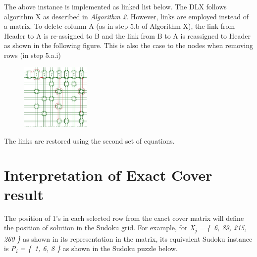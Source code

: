 \documentclass[a4paper,oneside,11pt]{report}
\begin{document}
The above instance is implemented as linked list below. The DLX follows algorithm X as described in \textit{Algorithm 2}.  However, links are employed instead of a matrix. To delete column A (as in step 5.b of Algorithm X), the link from Header to A is re-assigned to B and the link from B to A is reassigned to Header as shown in the following figure. This is also the case to the nodes when removing rows (in step 5.a.i)
\begin{figure}[h]
  \centering
  {\includegraphics[width=0.3\textwidth]{dlxlinkedlist.jpg}\label{fig:linkedlist}}
\end{figure}
\newline
The links are restored using the second set of equations.

\section{Interpretation of Exact Cover result}
The position of 1’s in each selected row from the exact cover matrix will define the position of solution in the Sudoku grid. For example, for {\itshape X\textsubscript{j} = \{\ 6, 89, 215, 260 \}} as shown in its representation in the matrix, its equivalent Sudoku instance is {\itshape P\textsubscript{i} = \{\ 1, 6, 8 \}} as shown in the Sudoku puzzle below.
\end{document}
